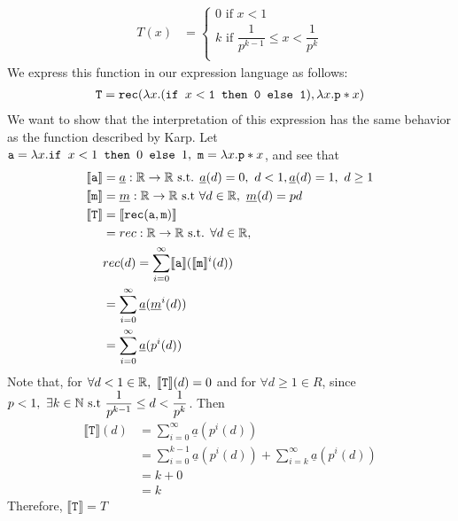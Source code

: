\begin{align*}
T(x) &= 
 \begin{cases}
 0 \text{ if } x < 1 \\
 k \text{ if }  \dfrac{1}{p^{k-1}} \leq x < \dfrac{1}{p^k} \\
 \end{cases}
 \end{align*}
 We express this function in our expression language as follows: 
 \begin{align*}
 \texttt{T} = \texttt{rec}(\lambda x.(\texttt{if } x<\texttt{1} \texttt{ then } \texttt{0} \texttt{ else } \texttt{1}), \lambda x. \texttt{p}*x)
 \end{align*}
 We want to show that the interpretation of this expression has the same behavior as the function described by Karp.
 Let $\texttt{a} = \lambda x.\texttt{if } x<1 \texttt{ then } 0 \texttt{ else } 1, \ \texttt{m} = \lambda x.\texttt{p}*x$, and see that
 \begin{align*}
  \llbracket \texttt{a} \rrbracket &= \underline{a} : \mathbb{R} \rightarrow \mathbb{R} \text{ s.t. } \underline{a}(d) = 0, 
  \ d<1, \underline{a}(d) = 1, \ d \geq 1  \\
 \llbracket \texttt{m} \rrbracket &= \underline{m} : \mathbb{R} \rightarrow \mathbb{R} \text{ s.t } \forall d \in \mathbb{R}, \
 \underline{m}(d) = pd \\
 \llbracket \texttt{T} \rrbracket&= \llbracket \texttt{rec}(\texttt{a}, \texttt{m}) \rrbracket \\
 &= rec: \mathbb{R} \rightarrow \mathbb{R} \text{ s.t. } \forall d \in \mathbb{R}, \\
 &rec(d) = \sum_{i=0}^{\infty}\llbracket \texttt{a} \rrbracket (\llbracket \texttt{m} \rrbracket^i(d)) \\
 &= \sum_{i=0}^{\infty}\underline{a} (\underline{m}^i(d)) \\
 &= \sum_{i=0}^{\infty}\underline{a} (p^i(d))
 \end{align*}
Note that, for $\forall d<1 \in \mathbb{R}, \ \llbracket \texttt{T} \rrbracket(d) = 0$
and for $\forall d \geq 1 \in R$, since $p < 1, \ \exists k \in \mathbb{N} \text{ s.t } \dfrac{1}{p^{k-1}} \leq d < \dfrac{1}{p^k}$. Then
\begin{align*}
\llbracket \texttt{T} \rrbracket(d)&= \sum_{i=0}^{\infty}\underline{a} (p^i(d)) \\
&= \sum_{i=0}^{k-1}\underline{a} (p^i(d)) + \sum_{i=k}^{\infty}\underline{a} (p^i(d)) \\
&= k + 0 \\
&= k
\end{align*}
Therefore, $\llbracket \texttt{T} \rrbracket = T$
 

